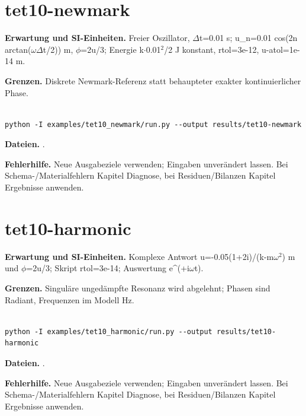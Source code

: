 

\section{tet10-newmark}\label{recipe:tet10-newmark}

\textbf{Erwartung und SI-Einheiten.} Freier Oszillator, $\Delta$t=0.01 s; u\_n=0.01 cos(2n arctan($\omega$$\Delta$t/2)) m, $\phi$=2u/3; Energie k$\cdot$0.01$^2$/2 J konstant, rtol=3e-12, u-atol=1e-14 m.

\textbf{Grenzen.} Diskrete Newmark-Referenz statt behaupteter exakter kontinuierlicher Phase.

\begin{lstlisting}

python -I examples/tet10_newmark/run.py --output results/tet10-newmark

\end{lstlisting}

\textbf{Dateien.} .

\textbf{Fehlerhilfe.} Neue Ausgabeziele verwenden; Eingaben unverändert lassen. Bei Schema-/Materialfehlern Kapitel Diagnose, bei Residuen/Bilanzen Kapitel Ergebnisse anwenden.



\section{tet10-harmonic}\label{recipe:tet10-harmonic}

\textbf{Erwartung und SI-Einheiten.} Komplexe Antwort u=-0.05(1+2i)/(k-m$\omega$$^2$) m und $\phi$=2u/3; Skript rtol=3e-14; Auswertung e\textasciicircum{}(+i$\omega$t).

\textbf{Grenzen.} Singuläre ungedämpfte Resonanz wird abgelehnt; Phasen sind Radiant, Frequenzen im Modell Hz.

\begin{lstlisting}

python -I examples/tet10_harmonic/run.py --output results/tet10-harmonic

\end{lstlisting}

\textbf{Dateien.} .

\textbf{Fehlerhilfe.} Neue Ausgabeziele verwenden; Eingaben unverändert lassen. Bei Schema-/Materialfehlern Kapitel Diagnose, bei Residuen/Bilanzen Kapitel Ergebnisse anwenden.


